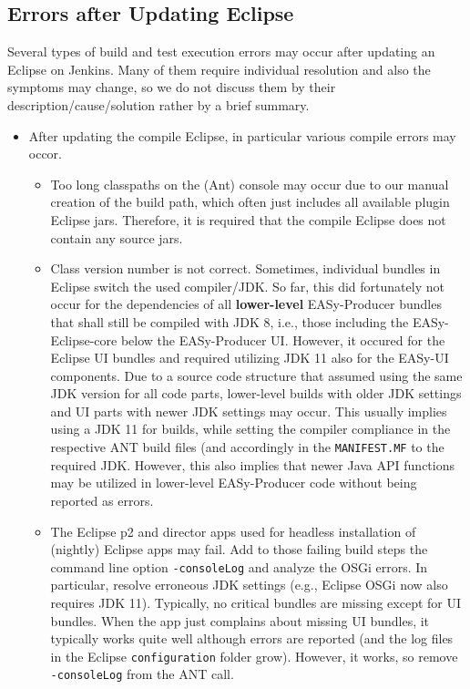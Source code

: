 \subsection{Errors after Updating Eclipse}
Several types of build and test execution errors may occur after updating an Eclipse on Jenkins. Many of them require individual resolution and also the symptoms may change, so we do not discuss them by their description/cause/solution rather by a brief summary. 
\begin{itemize}
    \item After updating the compile Eclipse, in particular various compile errors may occor. 
    \begin{itemize}
      \item Too long classpaths on the (Ant) console may occur due to our manual creation of the build path, which often just includes all available plugin Eclipse jars. Therefore, it is required that the compile Eclipse does not contain any source jars.
      \item Class version number is not correct. Sometimes, individual bundles in Eclipse switch the used compiler/JDK. So far, this did fortunately not occur for the dependencies of all \textbf{lower-level} EASy-Producer bundles that shall still be compiled with JDK 8, i.e., those including the EASy-Eclipse-core below the EASy-Producer UI. However, it occured for the Eclipse UI bundles and required utilizing JDK 11 also for the EASy-UI components. Due to a source code structure that assumed using the same JDK version for all code parts, lower-level builds with older JDK settings and UI parts with newer JDK settings may occur. This usually implies using a JDK 11 for builds, while setting the compiler compliance in the respective ANT build files (and accordingly in the \texttt{MANIFEST.MF} to the required JDK. However, this also implies that newer Java API functions may be utilized in lower-level EASy-Producer code without being reported as errors.
      \item The Eclipse p2 and director apps used for headless installation of (nightly) Eclipse apps may fail. Add to those failing build steps the command line option \texttt{-consoleLog} and analyze the OSGi errors. In particular, resolve erroneous JDK settings (e.g., Eclipse OSGi now also requires JDK 11). Typically, no critical bundles are missing except for UI bundles. When the app just complains about missing UI bundles, it typically works quite well although errors are reported (and the log files in the Eclipse \texttt{configuration} folder grow). However, it works, so remove \texttt{-consoleLog} from the ANT call.

\end{itemize}
\end{itemize}
